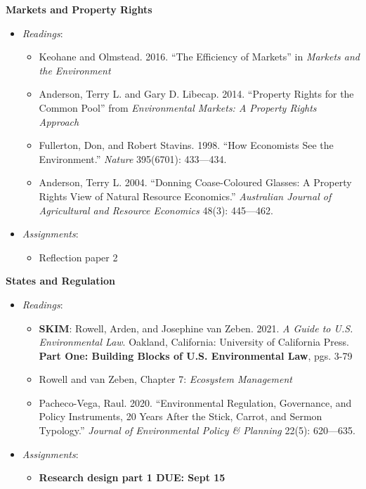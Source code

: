\week \textbf{Markets and Property Rights}

\begin{itemize}

\item
  \emph{Readings}:

  \begin{itemize}
  
  \item
    Keohane and Olmstead. 2016. ``The Efficiency of Markets'' in
    \emph{Markets and the Environment}
  \item
    Anderson, Terry L. and Gary D. Libecap. 2014. ``Property Rights for
    the Common Pool'' from \emph{Environmental Markets: A Property
    Rights Approach}
  \item
    Fullerton, Don, and Robert Stavins. 1998. ``How Economists See the
    Environment.'' \emph{Nature} 395(6701): 433---434.
  \item
    Anderson, Terry L. 2004. ``Donning Coase-Coloured Glasses: A
    Property Rights View of Natural Resource Economics.''
    \emph{Australian Journal of Agricultural and Resource Economics}
    48(3): 445---462.
  \end{itemize}
\item
  \emph{Assignments}:

  \begin{itemize}
  
  \item
    Reflection paper 2
  \end{itemize}
\end{itemize}

\week \textbf{States and Regulation}

\begin{itemize}

\item
  \emph{Readings}:

  \begin{itemize}
  
  \item
    \textbf{SKIM}: Rowell, Arden, and Josephine van Zeben. 2021. \emph{A
    Guide to U.S. Environmental Law}. Oakland, California: University of
    California Press. \textbf{Part One: Building Blocks of U.S.
    Environmental Law}, pgs. 3-79
  \item
    Rowell and van Zeben, Chapter 7: \emph{Ecosystem Management}
  \item
    Pacheco-Vega, Raul. 2020. ``Environmental Regulation, Governance,
    and Policy Instruments, 20 Years After the Stick, Carrot, and Sermon
    Typology.'' \emph{Journal of Environmental Policy \& Planning}
    22(5): 620---635.
  \end{itemize}
\item
  \emph{Assignments}:

  \begin{itemize}
  
  \item
    \textbf{Research design part 1 DUE: Sept 15}
  \end{itemize}
\end{itemize}

